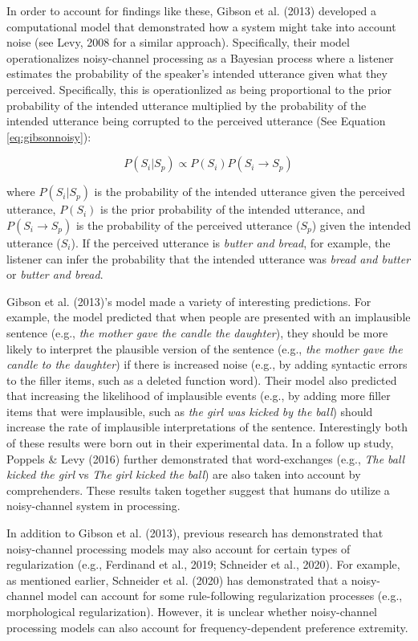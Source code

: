 \documentclass[10pt, letterpaper, hidelinks]{article}
\begin{document}
In order to account for findings like these, Gibson et al. (2013)
developed a computational model that demonstrated how a system might
take into account noise (see Levy, 2008 for a similar approach).
Specifically, their model operationalizes noisy-channel processing as a
Bayesian process where a listener estimates the probability of the
speaker's intended utterance given what they perceived. Specifically,
this is operationlized as being proportional to the prior probability of
the intended utterance multiplied by the probability of the intended
utterance being corrupted to the perceived utterance (See Equation
\ref{eq:gibsonnoisy}):

\begin{equation}
\label{eq:gibsonnoisy}
P(S_i|S_p) \propto P(S_i) P(S_i \to S_p)
\end{equation}

\noindent where \(P(S_i|S_p)\) is the probability of the intended
utterance given the perceived utterance, \(P(S_i)\) is the prior
probability of the intended utterance, and \(P(S_i \to S_p)\) is the
probability of the perceived utterance (\(S_p\)) given the intended
utterance (\(S_i\)). If the perceived utterance is \emph{butter and
bread}, for example, the listener can infer the probability that the
intended utterance was \emph{bread and butter} or \emph{butter and
bread}.

Gibson et al. (2013)'s model made a variety of interesting predictions.
For example, the model predicted that when people are presented with an
implausible sentence (e.g., \emph{the mother gave the candle the
daughter}), they should be more likely to interpret the plausible
version of the sentence (e.g., \emph{the mother gave the candle to the
daughter}) if there is increased noise (e.g., by adding syntactic errors
to the filler items, such as a deleted function word). Their model also
predicted that increasing the likelihood of implausible events (e.g., by
adding more filler items that were implausible, such as \emph{the girl
was kicked by the ball}) should increase the rate of implausible
interpretations of the sentence. Interestingly both of these results
were born out in their experimental data. In a follow up study, Poppels
\& Levy (2016) further demonstrated that word-exchanges (e.g., \emph{The
ball kicked the girl} vs \emph{The girl kicked the ball}) are also taken
into account by comprehenders. These results taken together suggest that
humans do utilize a noisy-channel system in processing.

In addition to Gibson et al. (2013), previous research has demonstrated
that noisy-channel processing models may also account for certain types
of regularization (e.g., Ferdinand et al., 2019; Schneider et al.,
2020). For example, as mentioned earlier, Schneider et al. (2020) has
demonstrated that a noisy-channel model can account for some
rule-following regularization processes (e.g., morphological
regularization). However, it is unclear whether noisy-channel processing
models can also account for frequency-dependent preference extremity.
\end{document}
